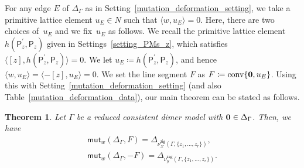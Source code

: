 \documentclass[11pt]{article}
\numberwithin{equation}{section}
\numberwithin{equation}{section}
\numberwithin{figure}{section}
\numberwithin{table}{section}
\newtheorem{Theorem}{Theorem}[section]
\newcommand{\calX}{\mathcal{X}}
\newcommand{\calY}{\mathcal{Y}}
\newcommand{\sfP}{\mathsf{P}}
\newcommand{\zig}{\mathsf{zig}}
\newcommand{\zag}{\mathsf{zag}}
\newcommand{\mutation}{\mathsf{mut}}
\begin{document}
For any edge $E$ of $\Delta_\Gamma$ as in Setting~\ref{mutation_deformation_setting}, we take a primitive lattice element $u_E\in N$ such that $\langle w,u_E\rangle=0$.
Here, there are two choices of~$u_E$ and we fix~$u_E$ as follows.
We recall the primitive lattice element $h(\sfP^\prime_z,\sfP_z)$ given in Settings~\ref{setting_PMs_z}, which satisfies $\langle[z],h(\sfP^\prime_z,\sfP_z)\rangle=0$.
We let $u_E\coloneqq h(\sfP^\prime_z,\sfP_z)$, and hence $\langle w,u_E\rangle=\langle-[z],u_E\rangle=0$.
We set the line segment $F$ as $F\coloneqq \operatorname{conv}\{{\bf 0},u_E\}$.
Using this with Setting~\ref{mutation_deformation_setting} (and also Table~\ref{mutation_deformation_data}),
our main theorem can be stated as follows.

\begin{Theorem}\label{mutation=deformation}
Let $\Gamma$ be a reduced consistent dimer model with ${\bf 0}\in\Delta_\Gamma$.
Then, we have
\begin{gather*}
\mutation_{w}(\Delta_\Gamma,F)=\Delta_{\nu^\zig_\calX(\Gamma,\{z_1,\dots,z_r\})},\\
\mutation_{w}(\Delta_\Gamma,-F)=\Delta_{\nu^\zag_\calY(\Gamma,\{z_1,\dots,z_r\})}.
\end{gather*}
\end{Theorem}
\end{document}
